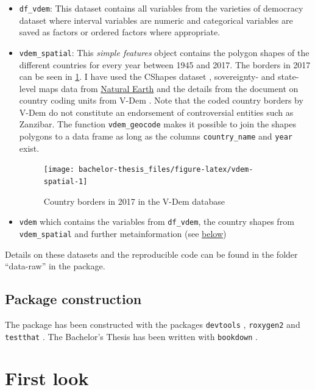 \documentclass[]{report}
\providecommand{\tightlist}{%
  \setlength{\itemsep}{0pt}\setlength{\parskip}{0pt}}
\theoremstyle{definition}
\theoremstyle{definition}
\theoremstyle{definition}
\theoremstyle{remark}
\begin{document}
\begin{itemize}
\tightlist
\item
  \texttt{df\_vdem}: This dataset contains all variables from the
  varieties of democracy dataset where interval variables are numeric
  and categorical variables are saved as factors or ordered factors
  where appropriate.
\item
  \texttt{vdem\_spatial}: This \emph{simple features} object \citep{sf}
  contains the polygon shapes of the different countries for every year
  between 1945 and 2017. The borders in 2017 can be seen in
  \ref{fig:vdem-spatial}. I have used the CShapes dataset
  \citep[\citet{Weidmann2010a}]{Weidmann2010}, sovereignty- and
  state-level maps data from \href{www.naturalearthdata.com}{Natural
  Earth} and the details from the document on country coding units from
  V-Dem \citep{Coppedge2018}. Note that the coded country borders by
  V-Dem do not constitute an endorsement of controversial entities such
  as Zanzibar. The function \texttt{vdem\_geocode} makes it possible to
  join the shapes polygons to a data frame as long as the columns
  \texttt{country\_name} and \texttt{year} exist.

  \begin{figure}
  \texttt{[image: bachelor-thesis\_files/figure-latex/vdem-spatial-1]} \caption{Country borders in 2017 in the V-Dem database}\label{fig:vdem-spatial}
  \end{figure}
\item
  \texttt{vdem} which contains the variables from \texttt{df\_vdem}, the
  country shapes from \texttt{vdem\_spatial} and further metainformation
  (see \protect\hyperlink{application}{below})
\end{itemize}

Details on these datasets and the reproducible code can be found in the
folder ``data-raw'' in the package.

\section{Package construction}\label{package-construction}

The package has been constructed with the packages \texttt{devtools}
\citep{devtools}, \texttt{roxygen2} \citep{roxygen2} and
\texttt{testthat} \citep{testthat}. The Bachelor's Thesis has been
written with \texttt{bookdown} \citep[\citet{bookdown-2}]{bookdown-1}.

\hypertarget{example}{\chapter{First look}\label{example}}
\end{document}
